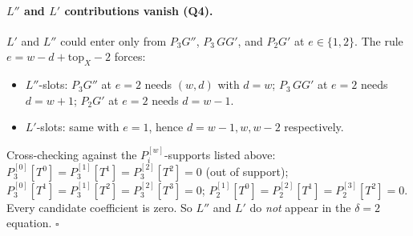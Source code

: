 \documentclass[11pt]{article}
\begin{document}
\paragraph{$L''$ and $L'$ contributions vanish (Q4).}
$L'$ and $L''$ could enter only from $P_3 G''$, $P_3\, GG'$, and $P_2 G'$
at $e \in \{1, 2\}$. The rule $e = w - d + \mathrm{top}_X - 2$ forces:
\begin{itemize}[nosep, leftmargin=1.5em]
  \item $L''$-slots: $P_3 G''$ at $e=2$ needs $(w,d)$ with $d = w$;
        $P_3\,GG'$ at $e=2$ needs $d = w+1$; $P_2 G'$ at $e=2$ needs
        $d = w-1$.
  \item $L'$-slots: same with $e = 1$, hence $d = w-1, w, w-2$
        respectively.
\end{itemize}
Cross-checking against the $P_i^{[w]}$-supports listed above:
$P_3^{[0]}[T^0] = P_3^{[1]}[T^1] = P_3^{[2]}[T^2] = 0$ (out of support);
$P_3^{[0]}[T^1] = P_3^{[1]}[T^2] = P_3^{[2]}[T^3] = 0$;
$P_2^{[1]}[T^0] = P_2^{[2]}[T^1] = P_2^{[3]}[T^2] = 0$. Every candidate
coefficient is zero. So $L''$ and $L'$ do \emph{not} appear in the
$\delta = 2$ equation. $\square$
\end{document}
